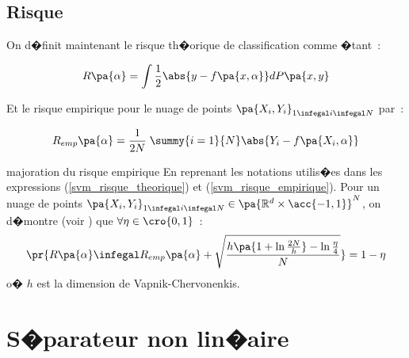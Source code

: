 \subsection{Risque}

On d�finit maintenant le risque th�orique de classification comme �tant~:

            \begin{eqnarray}
            R\pa{\alpha} = \int \frac{1}{2} \abs{y - f\pa{x,\alpha}} dP\pa{x,y}
            \label{svm_risque_theorique}
            \end{eqnarray}

Et le risque empirique pour le nuage de points $\pa{X_i,Y_i}_{1 \infegal i \infegal N}$ par~:

            \begin{eqnarray}
            R_{emp}\pa{\alpha} = \frac{1}{2N} \; \summy{i=1}{N} \abs{ Y_i - f\pa{X_i,\alpha}}
            \label{svm_risque_empirique}
            \end{eqnarray}

        \begin{xtheorem}{majoration du risque empirique}
        En reprenant les notations utilis�es dans les expressions 
        (\ref{svm_risque_theorique}) et (\ref{svm_risque_empirique}). Pour 
        un nuage de points  $\pa{X_i,Y_i}_{1 \infegal i \infegal N} \in \pa{\mathbb{R}^d \times \acc{-1,1} }^N$, 
        on d�montre (voir ) que $\forall \eta \in \cro{0,1}$~:
                    $$
                    \pr{ 
                    R\pa{\alpha} \infegal R_{emp}\pa{\alpha} +
                            \sqrt{\frac    {h \pa{ 1+ \ln \frac{2N}{h} } - \ln \frac{\eta}{4} }
                                                    {N}
                            }
                    } = 1 - \eta
                    $$
        o� $h$ est la dimension de Vapnik-Chervonenkis.
        \end{xtheorem}
        





\section{S�parateur non lin�aire}



